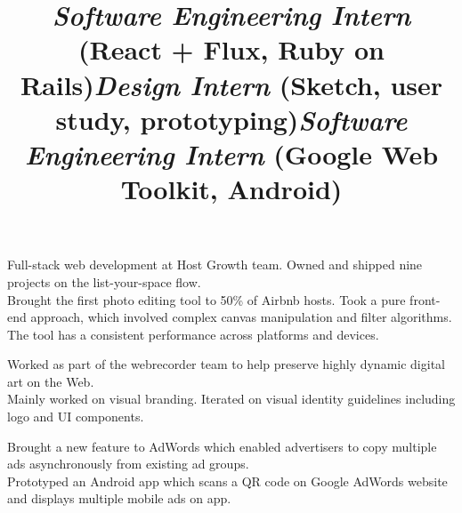 \begin{resume}
\title{\textsl{Software Engineering Intern} (React + Flux, Ruby on Rails)}
\begin{position}
Full-stack web development at Host Growth team. Owned and shipped nine projects on the list-your-space flow. \\
Brought the first photo editing tool to 50\% of Airbnb hosts. Took a pure front-end approach, which involved complex canvas manipulation and filter algorithms. The tool has a consistent performance across platforms and devices.
\end{position}

\title{\textsl{Design Intern} (Sketch, user study, prototyping)}
\begin{position}
Worked as part of the webrecorder team to help preserve highly dynamic digital art on the Web. \\
Mainly worked on visual branding. Iterated on visual identity guidelines including logo and UI components.
\end{position}

\title{\textsl{Software Engineering Intern} (Google Web Toolkit, Android)}
\begin{position}
Brought a new feature to AdWords which enabled advertisers to copy multiple ads asynchronously from existing ad groups. \\
Prototyped an Android app which scans a QR code on Google AdWords website and displays multiple mobile ads on app.

\end{position}




\begin{formatb}
  \\
  \body\\
\end{formatb}


\end{resume}
